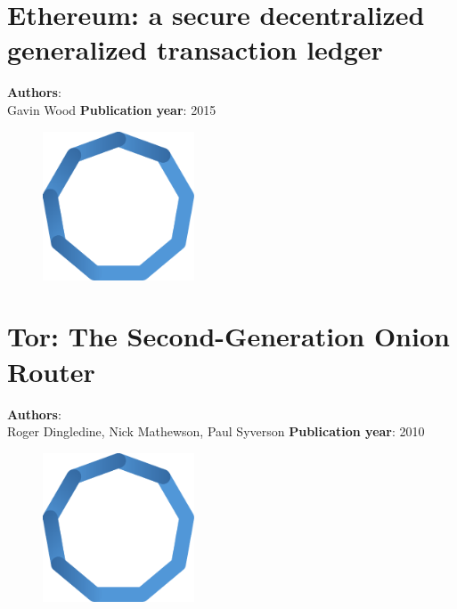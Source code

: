 \documentclass[11pt,fleqn]{book} %
\begin{document}
\chapter{Ethereum: a secure decentralized generalized transaction ledger}
\vspace*{-7mm}
\Large \textbf{Authors}: \\
Gavin Wood
\newline\newline
\textbf{Publication year}: 2015
\begin{figure}[b]
    \centering
    \includegraphics[width=0.4\textwidth]{distributed-systems-blue.pdf}
\end{figure}


\chapter{Tor: The Second-Generation Onion Router}
\vspace*{-7mm}
\Large \textbf{Authors}: \\
Roger Dingledine, Nick Mathewson, Paul Syverson
\newline\newline
\textbf{Publication year}: 2010
\begin{figure}[b]
    \centering
    \includegraphics[width=0.4\textwidth]{distributed-systems-blue.pdf}
\end{figure}


\pagecolor{blue}\afterpage{}
\newpage\null\thispagestyle{empty}\newpage
\end{document}
